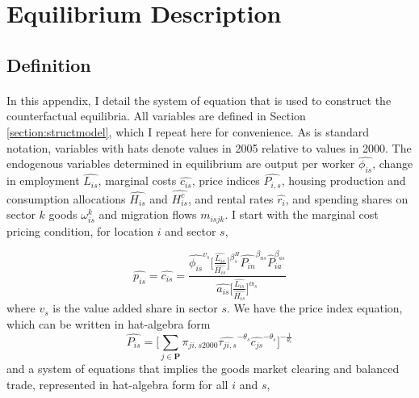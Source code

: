 \documentclass[]{article}
\theoremstyle{plain}
\begin{document}
\clearpage
\newpage
\section{Equilibrium Description }\label{appendix:eqdefcomp}
\paragraph*{}
\subsection*{Definition}
\paragraph*{}

In this appendix, I detail the system of equation that is used to construct the counterfactual equilibria. All variables are defined in Section \ref{section:structmodel}, which I repeat here for convenience. As is standard notation, variables with hats denote values in 2005 relative to values in 2000. The endogenous variables determined in equilibrium are output per worker $\hat{\phi_{is}}$, change in employment $\hat{L_{is}}$, marginal costs $\hat{c_{is}}$, price indices $\hat{P_{i,s}}$, housing production and consumption allocations $\hat{H_{is}}$ and $\hat{H^{c}_{is}}$, and rental rates $\hat{r_{i}}$, and spending shares on sector $k$ goods $\omega^{k}_{is}$ and migration flows $m_{isjk}$. I start with the marginal cost pricing condition, for location $i$ and sector $s$,

\begin{equation}
	\hat{p_{is}} = \hat{c_{is}} = \frac{\hat{\phi_{is}}^{v_{s}}\bigg[\frac{\hat{L_{is}}}{\hat{H_{is}}}\bigg]^{\beta^{H}_{s}}\hat{P_{in}}^{\beta_{ns}}\hat{P}_{ia}^{\beta_{as}}}{\hat{a_{is}}\bigg[\frac{\hat{L_{is}}}{\hat{H_{is}}}\bigg]^{\alpha_{s}}}	
\end{equation}
where $v_{s}$ is the value added share in sector $s$. We have the price index equation, which can be written in hat-algebra form
\begin{equation}
	\hat{P_{is}} = \bigg[\sum_{j \in \mathbf{P}}\pi_{ji,s2000}\hat{\tau_{ji,s}}^{-\theta_{s}}\hat{c_{js}}^{-\theta_{s}}\bigg]^{-\frac{1}{\theta_{s}}}
\end{equation}
and a system of equations that implies the goods market clearing and balanced trade, represented in hat-algebra form for all $i$ and $s$,
\end{document}
